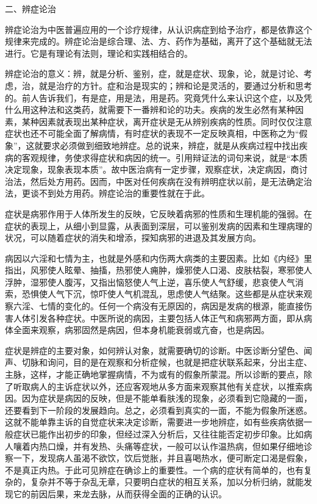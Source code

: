 \documentclass[a4paper,12pt,UTF8,twoside]{ctexbook}
\begin{document}
二、辨症论治

辨症论治为中医普遍应用的一个诊疗规律，从认识病症到给予治疗，都是依靠这个规律来完成的。辨症论治是综合理、法、方、药作为基础，离开了这个基础就无法进行。它是有理论有法则，理论和实践相结合的。

辨症论治的意义：辨，就是分析、鉴别，症，就是症状、现象，论，就是讨论、考虑，治，就是治疗的方针。症和治是现实的；辨和论是灵活的，要通过分析和思考的。前人告诉我们，有是症，用是法，用是药。究竟凭什么来认识这个症，以及凭什么用这种法和这类药，就需要下一番辨和论的功夫。疾病的发生必然有某种因素，某种因素就表现出某种症状，离开症状是无从辨别疾病的性质。同时仅仅注意症状也还不可能全面了解病情，有时症状的表现不一定反映真相，中医称之为“假象”，这就要求必须做到细致地辨症。总的说来，辨症，就是从疾病过程中找出疾病的客观规律，务使求得症状和病因的统一。引用辩证法的词句来说，就是“本质决定现象，现象表现本质”。故中医治病有一定步骤，观察症状，决定病因，商讨治法，然后处方用药。因而，中医对任何疾病在没有辨明症状以前，是无法确定治法，更谈不到处方用药。辨症论治的重要性就在于此。

症状是病邪作用于人体所发生的反映，它反映着病邪的性质和生理机能的强弱。在症状的表现上，从细小到显露，从表面到深层，可以鉴别发病的因素和生理病理的状况，可以随着症状的消失和增添，探知病邪的进退及其发展方向。

病因以六淫和七情为主，也就是外感和内伤两大病类的主要因素。比如《内经》里指出，风邪使人眩晕、抽搐，热邪使人痈肿，燥邪使人口渴、皮肤枯裂，寒邪使人浮肿，湿邪使人腹泻，又指出恼怒使人气上逆，喜乐使人气舒缓，悲哀使人气消索，恐惧使人气下沉，惊吓使人气机混乱，思虑使人气结聚。这些都是从症状来观察六淫、七情的变化的。任何一个病没有无原因的，病因是发病的根源，能直接伤害人体引发各种症状。中医所说的病因，主要包括人体正气和病邪两方面，即从病体全面来观察，病邪固然是病因，但本身机能衰弱或亢奋，也是病因。

症状是辨症的主要对象，如何辨认对象，就需要确切的诊断。中医诊断分望色、闻声、切脉和询问，目的是在观察和分析症候，也就是把症状联系起来，分出主症、主脉，这样，才能正确地掌握病情，不为或有的假象所蒙混。所以诊断的要点，除了听取病人的主诉症状以外，还应客观地从多方面来观察其他有关症状，以推索病因。因为症状是病因的反映，但是不能单看肤浅的现象，必须看到它隐藏的一面，还要看到下一阶段的发展趋向。总之，必须看到真实的一面，不能为假象所迷惑。这就不能单靠主诉的自觉症状来决定诊断，需要进一步地辨症，如有些疾病依据一般症状已能作出初步的印象，但经过深入分析后，又往往能否定初步印象。比如病人嚷着内热口燥，并有发热、头痛等症状，一般可以认作温热病，但如果仔细地诊察一下，发现病人虽渴不欲饮，饮后觉胀，并且喜喝热水，便可断定口渴是假象，不是真正内热。于此可见辨症在确诊上的重要性。一个病的症状有简单的，也有复杂的，复杂并不等于杂乱无章，只要明白症状的相互关系，加以分析归纳，就能发现它的前因后果，来龙去脉，从而获得全面的正确的认识。
\end{document}
